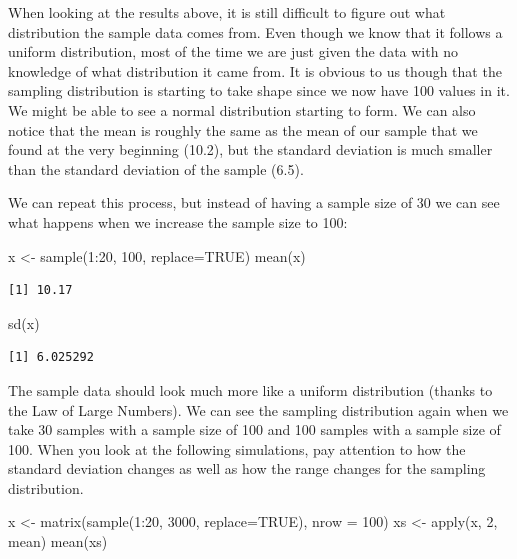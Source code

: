 \documentclass[
  letterpaper,
  DIV=11,
  numbers=noendperiod]{scrreprt}
\newenvironment{Shaded}{\begin{snugshade}}{\end{snugshade}}
\newcommand{\AttributeTok}[1]{\textcolor[rgb]{0.40,0.45,0.13}{#1}}
\newcommand{\ConstantTok}[1]{\textcolor[rgb]{0.56,0.35,0.01}{#1}}
\newcommand{\DecValTok}[1]{\textcolor[rgb]{0.68,0.00,0.00}{#1}}
\newcommand{\FunctionTok}[1]{\textcolor[rgb]{0.28,0.35,0.67}{#1}}
\newcommand{\NormalTok}[1]{\textcolor[rgb]{0.00,0.23,0.31}{#1}}
\newcommand{\OtherTok}[1]{\textcolor[rgb]{0.00,0.23,0.31}{#1}}
\newcommand{\SpecialCharTok}[1]{\textcolor[rgb]{0.37,0.37,0.37}{#1}}
\begin{document}
When looking at the results above, it is still difficult to figure out
what distribution the sample data comes from. Even though we know that
it follows a uniform distribution, most of the time we are just given
the data with no knowledge of what distribution it came from. It is
obvious to us though that the sampling distribution is starting to take
shape since we now have 100 values in it. We might be able to see a
normal distribution starting to form. We can also notice that the mean
is roughly the same as the mean of our sample that we found at the very
beginning (10.2), but the standard deviation is much smaller than the
standard deviation of the sample (6.5).

We can repeat this process, but instead of having a sample size of 30 we
can see what happens when we increase the sample size to 100:

\begin{Shaded}
\begin{Highlighting}[]
\NormalTok{x }\OtherTok{\textless{}{-}} \FunctionTok{sample}\NormalTok{(}\DecValTok{1}\SpecialCharTok{:}\DecValTok{20}\NormalTok{, }\DecValTok{100}\NormalTok{, }\AttributeTok{replace=}\ConstantTok{TRUE}\NormalTok{)}
\FunctionTok{mean}\NormalTok{(x)}
\end{Highlighting}
\end{Shaded}

\begin{verbatim}
[1] 10.17
\end{verbatim}

\begin{Shaded}
\begin{Highlighting}[]
\FunctionTok{sd}\NormalTok{(x)}
\end{Highlighting}
\end{Shaded}

\begin{verbatim}
[1] 6.025292
\end{verbatim}

The sample data should look much more like a uniform distribution
(thanks to the Law of Large Numbers). We can see the sampling
distribution again when we take 30 samples with a sample size of 100 and
100 samples with a sample size of 100. When you look at the following
simulations, pay attention to how the standard deviation changes as well
as how the range changes for the sampling distribution.

\begin{Shaded}
\begin{Highlighting}[]
\NormalTok{x }\OtherTok{\textless{}{-}} \FunctionTok{matrix}\NormalTok{(}\FunctionTok{sample}\NormalTok{(}\DecValTok{1}\SpecialCharTok{:}\DecValTok{20}\NormalTok{, }\DecValTok{3000}\NormalTok{, }\AttributeTok{replace=}\ConstantTok{TRUE}\NormalTok{), }\AttributeTok{nrow =} \DecValTok{100}\NormalTok{)}
\NormalTok{xs }\OtherTok{\textless{}{-}} \FunctionTok{apply}\NormalTok{(x, }\DecValTok{2}\NormalTok{, mean)}
\FunctionTok{mean}\NormalTok{(xs)}
\end{Highlighting}
\end{Shaded}
\end{document}
